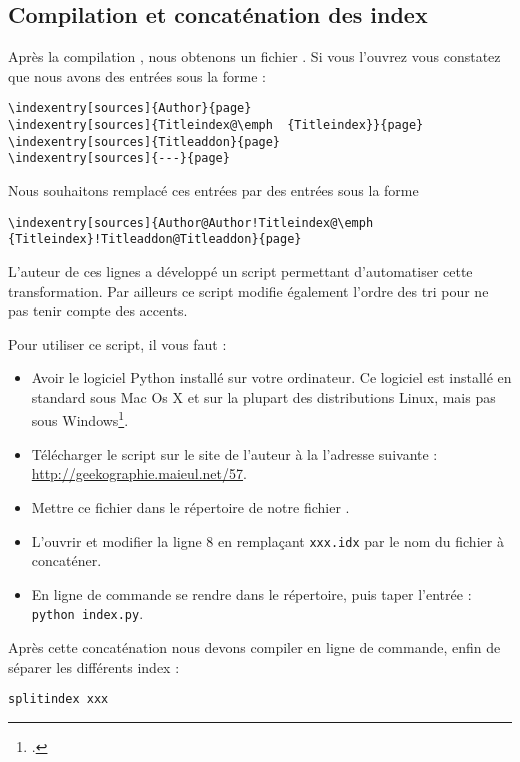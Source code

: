 \subsection{Compilation et concaténation des index}


Après la  compilation \XeLaTeX, nous obtenons un fichier . Si vous l'ouvrez vous constatez que nous avons des entrées sous la forme : 

\begin{verbatim}
\indexentry[sources]{Author}{page}
\indexentry[sources]{Titleindex@\emph  {Titleindex}}{page}
\indexentry[sources]{Titleaddon}{page}
\indexentry[sources]{---}{page}
\end{verbatim}

Nous souhaitons remplacé ces entrées par des entrées sous la forme 

\begin{verbatim}
\indexentry[sources]{Author@Author!Titleindex@\emph  {Titleindex}!Titleaddon@Titleaddon}{page}
\end{verbatim}

L'auteur de ces lignes a développé un script permettant d'automatiser cette transformation. Par ailleurs ce script modifie également l'ordre des tri pour ne pas tenir compte des accents.

Pour utiliser ce script, il vous faut :
\begin{itemize}
\item Avoir le logiciel Python installé sur votre ordinateur. Ce logiciel est installé en standard sous Mac Os X et sur la plupart des distributions Linux, mais pas sous Windows\footcite{python_windows}.
\item Télécharger le script sur le site de l'auteur à la l'adresse suivante : \url{http://geekographie.maieul.net/57}.
\item Mettre ce fichier dans le répertoire de notre fichier . 
\item L'ouvrir et modifier la ligne 8 en remplaçant \verb|xxx.idx| par le nom du fichier à concaténer.
\item En ligne de commande se rendre dans le  répertoire, puis taper l'entrée : \verb|python index.py|.
\end{itemize}


Après cette concaténation nous devons compiler en ligne de commande, enfin de séparer les différents index :
\begin{verbatim}
splitindex xxx
\end{verbatim}


